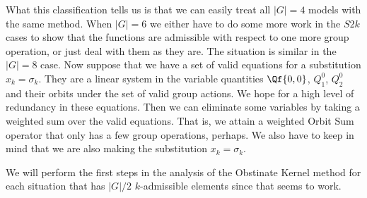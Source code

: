 What this classification tells us is that we can easily treat all $|G| = 4$ models with the same method. When $|G| = 6$ we either have to do some more work in the $S2k$ cases to show that the functions are admissible with respect to one more group operation, or just deal with them as they are. The situation is similar in the $|G| = 8$ case. Now suppose that we have a set of valid equations for a substitution $x_k = \sigma_k$. They are a linear system in the variable quantities $\Qf{0,0}$, $ Q_1^0$, $ Q_2^0$ and their orbits under the set of valid group actions. We hope for a high level of redundancy in these equations. Then we can eliminate some variables by taking a weighted sum over the valid equations. That is, we attain a weighted Orbit Sum operator that only has a few group operations, perhaps. We also have to keep in mind that we are also making the substitution $x_k = \sigma_k$.

We will perform the first steps in the analysis of the Obstinate Kernel method for each situation that has $|G|/2$ $k$-admissible elements since that seems to work.
